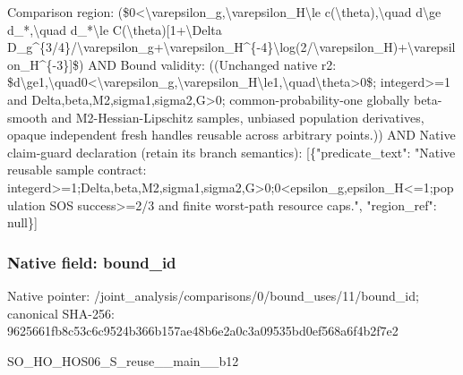 \documentclass[10pt,a4paper]{article}
\begin{document}
\begingroup\raggedright\sloppy Comparison region:\allowbreak{} (\$0<\textbackslash{}varepsilon\_\allowbreak{}g,\allowbreak{}\textbackslash{}varepsilon\_\allowbreak{}H\textbackslash{}le c(\textbackslash{}theta),\allowbreak{}\textbackslash{}quad d\textbackslash{}ge d\_\allowbreak{}*,\allowbreak{}\textbackslash{}quad d\_\allowbreak{}*\textbackslash{}le C(\textbackslash{}theta)[1+\textbackslash{}Delta D\_\allowbreak{}g\textasciicircum{}\{3/\allowbreak{}4\}/\allowbreak{}\textbackslash{}varepsilon\_\allowbreak{}g+\textbackslash{}varepsilon\_\allowbreak{}H\textasciicircum{}\{-4\}\textbackslash{}log(2/\allowbreak{}\textbackslash{}varepsilon\_\allowbreak{}H)+\textbackslash{}varepsilon\_\allowbreak{}H\textasciicircum{}\{-3\}]\$) AND Bound validity:\allowbreak{} ((Unchanged native r2:\allowbreak{} \$d\textbackslash{}ge1,\allowbreak{}\textbackslash{}quad0<\textbackslash{}varepsilon\_\allowbreak{}g,\allowbreak{}\textbackslash{}varepsilon\_\allowbreak{}H\textbackslash{}le1,\allowbreak{}\textbackslash{}quad\textbackslash{}theta>0\$;\allowbreak{} integerd>=\allowbreak{}1 and Delta,\allowbreak{}beta,\allowbreak{}M2,\allowbreak{}sigma1,\allowbreak{}sigma2,\allowbreak{}G>0;\allowbreak{} common-probability-one globally beta-smooth and M2-Hessian-Lipschitz samples,\allowbreak{} unbiased population derivatives,\allowbreak{} opaque independent fresh handles reusable across arbitrary points.)) AND Native claim-guard declaration (retain its branch semantics):\allowbreak{} [\{"predicate\_\allowbreak{}text":\allowbreak{} "Native reusable sample contract:\allowbreak{} integerd>=\allowbreak{}1;\allowbreak{}Delta,\allowbreak{}beta,\allowbreak{}M2,\allowbreak{}sigma1,\allowbreak{}sigma2,\allowbreak{}G>0;\allowbreak{}0<epsilon\_\allowbreak{}g,\allowbreak{}epsilon\_\allowbreak{}H<=\allowbreak{}1;\allowbreak{}population SOS success>=\allowbreak{}2/\allowbreak{}3 and finite worst-path resource caps.",\allowbreak{} "region\_\allowbreak{}ref":\allowbreak{} null\}]\par\endgroup

\subsubsection{Native field: bound\_\allowbreak{}id}
Native pointer: /joint\_\allowbreak{}analysis/comparisons/0/bound\_\allowbreak{}uses/11/bound\_\allowbreak{}id; canonical SHA-256: 9625661fb8c53c6c9524b366b157ae48b6e2a0c3a09535bd0ef568a6f4b2f7e2

\begingroup\raggedright\sloppy SO\_\allowbreak{}HO\_\allowbreak{}HOS06\_\allowbreak{}S\_\allowbreak{}reuse\_\allowbreak{}\_\allowbreak{}main\_\allowbreak{}\_\allowbreak{}b12\par\endgroup
\end{document}
